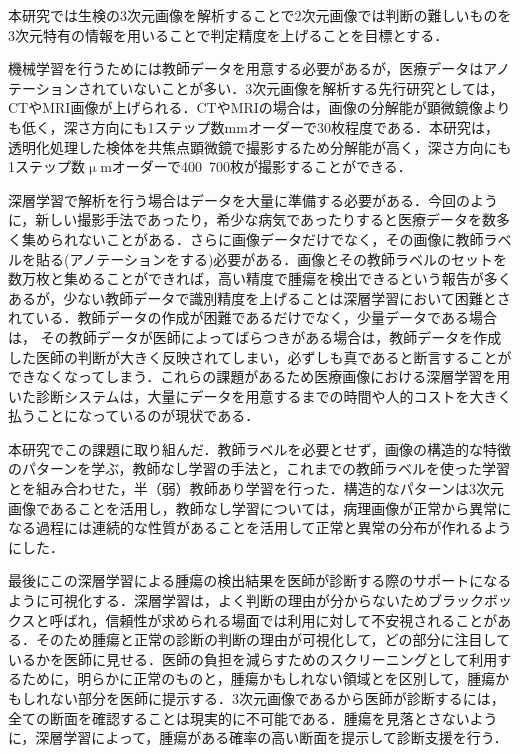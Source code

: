 本研究では生検の3次元画像を解析することで2次元画像では判断の難しいものを3次元特有の情報を用いることで判定精度を上げることを目標とする．

機械学習を行うためには教師データを用意する必要があるが，医療データはアノテーションされていないことが多い．3次元画像を解析する先行研究としては，CTやMRI画像が上げられる\cite{要出典}．CTやMRIの場合は，画像の分解能が顕微鏡像よりも低く，深さ方向にも1ステップ数mmオーダーで30枚程度である．本研究は，透明化処理した検体を共焦点顕微鏡で撮影するため分解能が高く，深さ方向にも1ステップ数$\upmu$mオーダーで400~700枚が撮影することができる．



深層学習で解析を行う場合はデータを大量に準備する必要がある．今回のように，新しい撮影手法であったり，希少な病気であったりすると医療データを数多く集められないことがある．さらに画像データだけでなく，その画像に教師ラベルを貼る(アノテーションをする)必要がある．画像とその教師ラベルのセットを数万枚と集めることができれば，高い精度で腫瘍を検出できるという報告が多くあるが\cite{要出典複数}，少ない教師データで識別精度を上げることは深層学習において困難とされている．教師データの作成が困難であるだけでなく，少量データである場合は，
その教師データが医師によってばらつきがある場合は，教師データを作成した医師の判断が大きく反映されてしまい，必ずしも真であると断言することができなくなってしまう．これらの課題があるため医療画像における深層学習を用いた診断システムは，大量にデータを用意するまでの時間や人的コストを大きく払うことになっているのが現状である．

本研究でこの課題に取り組んだ．教師ラベルを必要とせず，画像の構造的な特徴のパターンを学ぶ，教師なし学習の手法と，これまでの教師ラベルを使った学習とを組み合わせた，半（弱）教師あり学習を行った．構造的なパターンは3次元画像であることを活用し，教師なし学習については，病理画像が正常から異常になる過程には連続的な性質があることを活用して正常と異常の分布が作れるようにした．


最後にこの深層学習による腫瘍の検出結果を医師が診断する際のサポートになるように可視化する．深層学習は，よく判断の理由が分からないためブラックボックスと呼ばれ，信頼性が求められる場面では利用に対して不安視されることがある．そのため腫瘍と正常の診断の判断の理由が可視化して，どの部分に注目しているかを医師に見せる．医師の負担を減らすためのスクリーニングとして利用するために，明らかに正常のものと，腫瘍かもしれない領域とを区別して，腫瘍かもしれない部分を医師に提示する．3次元画像であるから医師が診断するには，全ての断面を確認することは現実的に不可能である．腫瘍を見落とさないように，深層学習によって，腫瘍がある確率の高い断面を提示して診断支援を行う．

